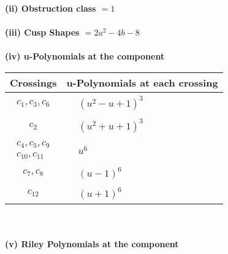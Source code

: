 \documentclass[1p]{elsarticle_modified}
\theoremstyle{definition}
\begin{document}
\flushleft \textbf{(ii) Obstruction class $= 1$}\\~\\
\flushleft \textbf{(iii) Cusp Shapes $= 2 a^2-4 b-8$}\\~\\
\newpage\renewcommand{\arraystretch}{1}
\flushleft \textbf{(iv) u-Polynomials at the component}\newline \\
\begin{tabular}{m{50pt}|m{274pt}}
Crossings & \hspace{64pt}u-Polynomials at each crossing \\
\hline $$\begin{aligned}c_{1},c_{3},c_{6}\end{aligned}$$&$\begin{aligned}
&(u^2- u+1)^3
\end{aligned}$\\
\hline $$\begin{aligned}c_{2}\end{aligned}$$&$\begin{aligned}
&(u^2+u+1)^3
\end{aligned}$\\
\hline $$\begin{aligned}c_{4},c_{5},c_{9}\\c_{10},c_{11}\end{aligned}$$&$\begin{aligned}
&u^6
\end{aligned}$\\
\hline $$\begin{aligned}c_{7},c_{8}\end{aligned}$$&$\begin{aligned}
&(u-1)^6
\end{aligned}$\\
\hline $$\begin{aligned}c_{12}\end{aligned}$$&$\begin{aligned}
&(u+1)^6
\end{aligned}$\\
\hline
\end{tabular}\\~\\
\newpage\renewcommand{\arraystretch}{1}
\flushleft \textbf{(v) Riley Polynomials at the component}\newline \\
\end{document}

